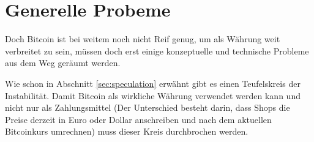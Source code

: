 \section{Generelle Probeme}

Doch Bitcoin ist bei weitem noch nicht Reif genug, um als Währung weit verbreitet zu sein, müssen doch erst einige konzeptuelle und technische Probleme aus dem Weg geräumt werden.

Wie schon in Abschnitt \ref{sec:speculation} erwähnt gibt es einen Teufelskreis der Instabilität.
Damit Bitcoin als wirkliche Währung verwendet werden kann und nicht nur als Zahlungsmittel (Der Unterschied besteht darin, dass Shops die Preise derzeit in Euro oder Dollar anschreiben und nach dem aktuellen Bitcoinkurs umrechnen) muss dieser Kreis durchbrochen werden.
